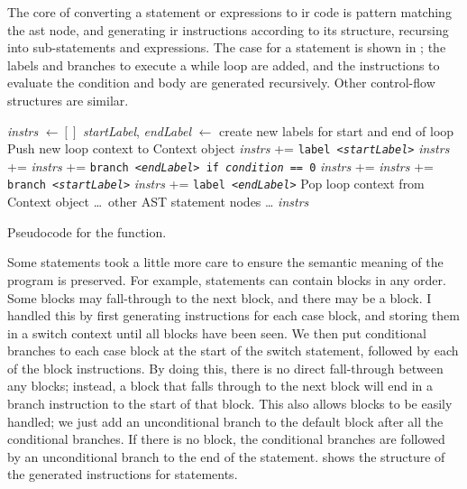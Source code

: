 \documentclass[00-main.tex]{subfiles}
\begin{document}
The core of converting a statement or expressions to \gls{ir} code is pattern matching the \gls{ast} node, and generating \gls{ir} instructions according to its structure, recursing into sub-statements and expressions.
The case for a  statement is shown in ; the labels and branches to execute a while loop are added, and the instructions to evaluate the condition and body are generated recursively.
Other control-flow structures are similar.

\begin{listing}[!ht]
  \begin{PseudocodeListing}
      \State \textit{instrs} $\gets []$
          \State \textit{startLabel}, \textit{endLabel} $\gets$ create new labels for start and end of loop
          \State Push new loop context to Context object
          \State \textit{instrs} += \texttt{label <\textrm{\textit{startLabel}}>}
          \State \textit{instrs} += 
          \State \textit{instrs} += \texttt{branch <\textrm{\textit{endLabel}}> if \textrm{\textit{condition}} == 0}
          \State \textit{instrs} += 
          \State \textit{instrs} += \texttt{branch <\textrm{\textit{startLabel}}>}
          \State \textit{instrs} += \texttt{label <\textrm{\textit{endLabel}}>}
          \State Pop loop context from Context object
        \EndMatchCase
        \State \ldots\ other AST statement nodes \ldots
      \EndMatch
      \State \Return \textit{instrs}
    \EndFunction
  \end{PseudocodeListing}
  \caption{Pseudocode for the  function.}
  \label{lst:convert while stmt to IR pseudocode}
\end{listing}

Some statements took a little more care to ensure the semantic meaning of the program is preserved.
For example,  statements can contain  blocks in any order.
Some blocks may fall-through to the next block, and there may be a  block.
I handled this by first generating instructions for each case block, and storing them in a switch context until all blocks have been seen.
We then put conditional branches to each case block at the start of the switch statement, followed by each of the block instructions.
By doing this, there is no direct fall-through between any blocks; instead, a block that falls through to the next block will end in a branch instruction to the start of that block.
This also allows  blocks to be easily handled; we just add an unconditional branch to the default block after all the conditional branches.
If there is no  block, the conditional branches are followed by an unconditional branch to the end of the  statement.
 shows the structure of the generated instructions for  statements.
\end{document}
